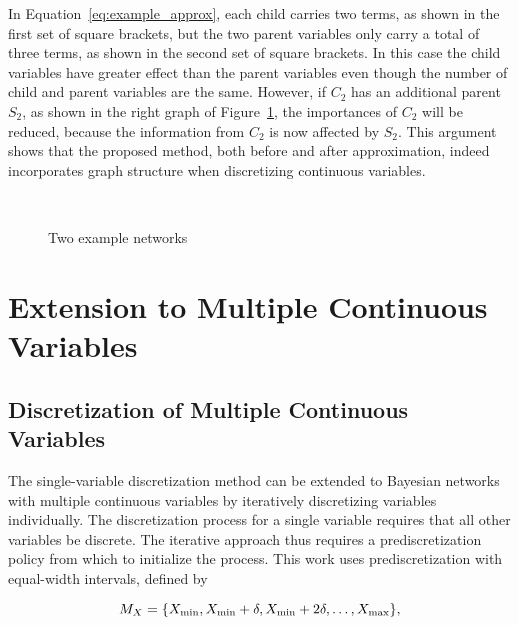 In Equation~\ref{eq:example_approx}, each child carries two terms, as shown in the first set of square brackets, but the two parent variables only carry a total of three terms, as shown in the second set of square brackets.
In this case the child variables have greater effect than the parent variables even though the number of child and parent variables are the same.
However, if $C_2$ has an additional parent $S_2$, as shown in the right graph of Figure~\ref{fig:example_networks}, the importances of $C_2$ will be reduced, because the information from $C_2$ is now affected by $S_2$.
This argument shows that the proposed method, both before and after approximation, indeed incorporates graph structure when discretizing continuous variables.

\begin{figure}[ht]
  \centering
  \begin{tabular}{cc}
    
    \end{tabular}
   \hspace{5em}
    \begin{tabular}{cc}
    
  \end{tabular}
  \caption{Two example networks}
  \label{fig:example_networks}
\end{figure}


\section{Extension to Multiple Continuous Variables}
\label{sec:multi_var}

\subsection{Discretization of Multiple Continuous Variables}

The single-variable discretization method can be extended to Bayesian networks with multiple continuous variables by iteratively discretizing variables individually.
The discretization process for a single variable requires that all other variables be discrete.
The iterative approach thus requires a prediscretization policy from which to initialize the process.
This work uses prediscretization with equal-width intervals, defined by

\begin{equation}
M_X = \curly{X_\text{min}, X_\text{min} + \delta, X_\text{min} + 2\delta, \ldots, X_\text{max}}\text{,}
\end{equation}

